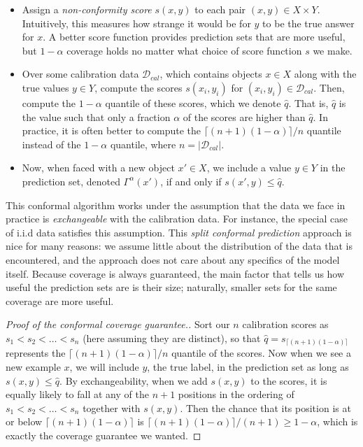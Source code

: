 \documentclass{scrartcl}
\begin{document}
\begin{itemize}
    \item Assign a \emph{non-conformity score} $s(x, y)$ to each pair $(x, y) \in X \times Y$. Intuitively, 
    this measures how strange it would be for
    $y$ to be the true answer for $x$. 
    A better score function provides prediction sets that are more useful, but $1 - \alpha$
    coverage holds no matter what choice of score function $s$ we make.

    \item Over some calibration data $\mathcal{D}_{cal}$, which contains objects $x \in X$ along with the true
    values $y \in Y$, compute the scores $s(x_i, y_i)$ for $(x_i, y_i) \in \mathcal{D}_{cal}$. Then, compute the $1 - \alpha$
    quantile of these scores, which we denote $\hat{q}$. That is, $\hat{q}$ is the value such that only a fraction $\alpha$ of the scores
    are higher than $\hat{q}$. In practice,
    it is often better to compute the $\lceil (n + 1)(1 - \alpha) \rceil/n$ quantile instead of the $1 - \alpha$ quantile,
    where $n = |\mathcal{D}_{cal}|$.

    \item Now, when faced with a new object $x' \in X$, we include a value $y \in Y$ in the prediction set, denoted
    $\Gamma^{\alpha}(x')$, if and only if $s(x', y) \le \hat{q}$.

\end{itemize}

This conformal algorithm works under the assumption that the data we face in practice is \emph{exchangeable}
with the calibration data. For instance, the special case of i.i.d data satisfies this assumption. 
This \emph{split conformal prediction} approach is nice for many reasons:
we assume little about the distribution of the data
that is encountered, and the approach does not care about any specifics of the model itself. 
Because coverage is always guaranteed, the main factor that
tells us how useful the prediction sets are is their size; naturally, smaller sets for the same coverage are more useful.

\begin{proof}[Proof of the conformal coverage guarantee.]
Sort our $n$ calibration scores as $s_1 < s_2 < \dots < s_n$ (here assuming they are distinct),
so that $\hat{q} = s_{\lceil (n + 1)(1 - \alpha) \rceil}$ represents the $\lceil (n + 1)(1 - \alpha) \rceil/n$ quantile of the scores.
Now when we see a new example $x$, we will include $y$, the true label, in the prediction set as long as $s(x, y) \le \hat{q}$.
By exchangeability, when we add $s(x, y)$ to the scores,
it is equally likely to fall at any of the $n + 1$ positions in the ordering of $s_1 < s_2 < \dots < s_n$ together with $s(x, y)$.
Then the chance that its position is at or below $\lceil (n + 1)(1 - \alpha) \rceil$ is
$\lceil (n + 1)(1 - \alpha) \rceil/(n + 1) \ge 1 - \alpha$, which is exactly the coverage guarantee we wanted.
\end{proof}
\end{document}
